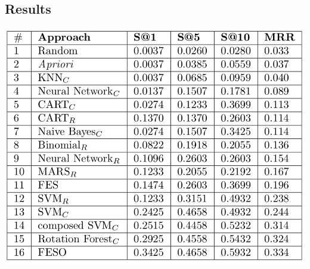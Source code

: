 \documentclass[40pt, a0, portrait]{a0poster}
\begin{document}
\begin{multicols}{2}

\section*{Results}

\begin{center}\vspace{1cm}
\includegraphics[width=0.8\linewidth]{resultados.png}
\end{center}\vspace{1cm}


\end{multicols}
\end{document}
